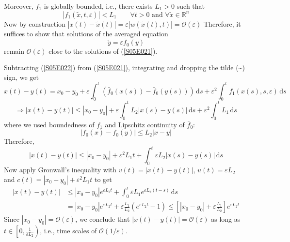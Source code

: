 \documentclass[twoside,10pt,a4paper]{article}
\begin{document}
Moreover, $f_1$ is globally bounded, i.e., there exists $L_1 > 0$ such that
\begin{equation*}
	|f_1(\tilde{x},t,\varepsilon)| < L_1 \qquad \forall t > 0 \text{ and } \forall \tilde{x}\in \mathbb{R}^n
\end{equation*}
Now by construction $|x(t) - \tilde{x}(t)| = \varepsilon|w(\tilde{x}(t),t)| = \mathcal{O}(\varepsilon)$
Therefore, it suffices to show that solutions of the averaged equation
\begin{equation}\label{S05E022}
	\dot{y} = \varepsilon \bar{f}_0(y)
\end{equation}
remain $\mathcal{O}(\varepsilon)$ close to the solutions of (\ref{S05E021}).

Subtracting (\ref{S05E022}) from (\ref{S05E021}), integrating and dropping the tilde (\textasciitilde) sign, we get 
\begin{equation*}
	x(t) - y(t) = x_0 - y_0 + \varepsilon \int_0^t \left( \bar{f}_0(x(s)) - \bar{f}_0(y(s)) \right) \, \text{d}s + \varepsilon^2 \int_0^t f_1(x(s),s,\varepsilon) \, \text{d}s
\end{equation*}
\begin{equation*}
	\Longrightarrow |x(t) - y(t)| \leq |x_0 - y_0| + \varepsilon \int_0^t L_2|x(s) - y(s)|\,\text{d}s + \varepsilon^2 \int_0^t L_1 \,\text{d}s
\end{equation*}
where we used boundedness of $f_1$ and Lipschitz continuity of $\bar{f}_0$:
\begin{equation*}
	|f_0(x) - f_0(y)| \leq L_2 |x - y|
\end{equation*}
Therefore,
\begin{equation}\label{S05E023}
	|x(t) - y(t)| \leq |x_0 - y_0| + \varepsilon^2 L_1t + \int_0^t \varepsilon L_2 |x(s) - y(s)|\,\text{d}s
\end{equation}
Now apply Gronwall's inequality with $v(t) = |x(t) - y(t)|$, $u(t) = \varepsilon L_2$ and $c(t) = |x_0 - y_0| + \varepsilon^2 L_1t$ to get
\begin{align*}
	|x(t) - y(t)| &\leq |x_0 - y_0|e^{\varepsilon L_2 t} + \int_0^t \varepsilon L_1 e^{\varepsilon L_2 (t-s)}\,\text{d}s \\
	&= |x_0 - y_0|e^{\varepsilon L_2 t} + \varepsilon \frac{L_1}{L_2} \left( e^{\varepsilon L_2 t} -1 \right) \leq \left[ |x_0 - y_0| + \varepsilon \frac{L_1}{L_2} \right] e^{\varepsilon L_2 t}
\end{align*}
Since $|x_0 - y_0| = \mathcal{O}(\varepsilon)$, we conclude that $|x(t) - y(t)|= \mathcal{O}(\varepsilon)$ as long as $t\in \left[0,\frac{1}{\varepsilon L_2}\right)$, i.e., time scales of $\mathcal{O}(1/\varepsilon)$.
\end{document}
